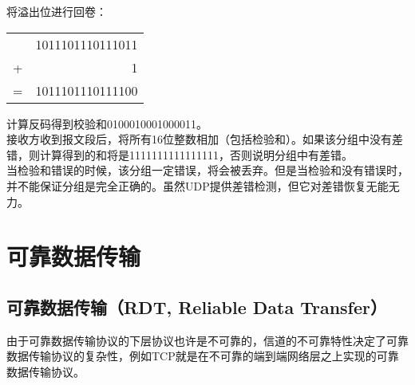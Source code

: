 将溢出位进行回卷：

\begin{table}[H]
	\centering
	\begin{tabular}{cD{.}{.}{3}}
		  & 1011101110111011 \\
		+ & 1                \\
		\hline
		= & 1011101110111100
	\end{tabular}
\end{table}

计算反码得到校验和0100010001000011。\\

接收方收到报文段后，将所有16位整数相加（包括检验和）。如果该分组中没有差错，则计算得到的和将是1111111111111111，否则说明分组中有差错。\\

当检验和错误的时候，该分组一定错误，将会被丢弃。但是当检验和没有错误时，并不能保证分组是完全正确的。虽然UDP提供差错检测，但它对差错恢复无能无力。

\newpage

\section{可靠数据传输}

\subsection{可靠数据传输（RDT, Reliable Data Transfer）}

由于可靠数据传输协议的下层协议也许是不可靠的，信道的不可靠特性决定了可靠数据传输协议的复杂性，例如TCP就是在不可靠的端到端网络层之上实现的可靠数据传输协议。\\

